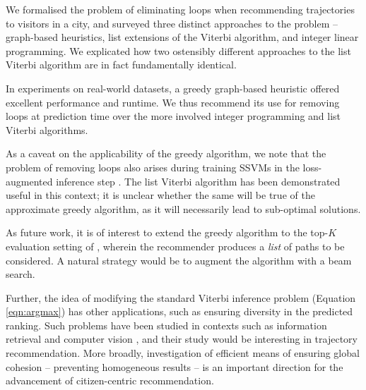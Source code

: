 
We formalised the problem of eliminating loops when recommending trajectories to visitors in a city,
and surveyed three distinct approaches to the problem --
graph-based heuristics,
list extensions of the Viterbi algorithm,
and integer linear programming.
We explicated how two ostensibly different approaches to the list Viterbi algorithm \citep{seshadri1994list,nilsson2001sequentially} are in fact fundamentally identical.

In experiments on real-world datasets,
a greedy graph-based heuristic offered excellent performance and runtime.
We thus recommend its use
for removing loops at prediction time
over the more involved integer programming and list Viterbi algorithms.

As a caveat on the applicability of the greedy algorithm,
we note that the problem of removing loops also arises during training SSVMs in the loss-augmented inference step \citep{Chen:2017}.
The list Viterbi algorithm has been demonstrated useful in this context;
it is unclear whether the same will be true of the approximate greedy algorithm, as it will necessarily lead to sub-optimal solutions.

As future work, it is of interest to extend the greedy algorithm to the top-$K$ evaluation setting of \citet{Chen:2017}, wherein the recommender produces a \emph{list} of paths to be considered.
A natural strategy would be to augment the algorithm with a beam search.

Further, the idea of modifying the standard Viterbi inference problem (Equation \ref{eqn:argmax}) has other applications, such
as ensuring diversity in the predicted ranking.
Such problems have been studied in contexts such as information retrieval \citep{Carbonell:1998} and computer vision \citep{Park:2011},
and their study would be interesting in trajectory recommendation.
More broadly, investigation of efficient means of ensuring global cohesion -- \eg preventing homogeneous results -- 
is an important direction for the advancement of citizen-centric recommendation.

